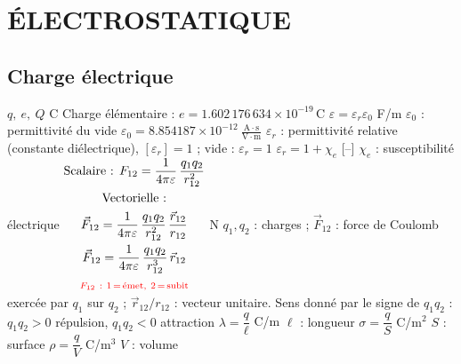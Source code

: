 \section{ÉLECTROSTATIQUE}

\subsection{Charge électrique}
\begin{formules}
    {$q,\ e,\ Q$}
    {C}
    {Charge élémentaire : \newline $e = 1.602\,176\,634\times10^{-19}$\,C}
    {$\varepsilon = \varepsilon_r\varepsilon_0$}
    {F/m}
    {$\varepsilon_0$ : permittivité du vide \newline
     $\varepsilon_0 = 8.854187\times10^{-12}\ \frac{\mathrm{A\cdot s}}{\mathrm{V\cdot m}}$ \newline
     $\varepsilon_r$ : permittivité relative (constante diélectrique), \newline
     $[\varepsilon_r] = 1$ ; vide : $\varepsilon_r = 1$}
    {$\varepsilon_r = 1 + \chi_e$}
    {[--]}
    {$\chi_e$ : susceptibilité électrique \newline [--]}
    {$\begin{gathered}
      \text{Scalaire : } F_{12} = \frac{1}{4\pi\varepsilon}\,\frac{q_1q_2}{r_{12}^2} \\
      \text{Vectorielle :} \\
      \vec F_{12} = \frac{1}{4\pi\varepsilon}\,\frac{q_1q_2}{r_{12}^2}\,\frac{\vec r_{12}}{r_{12}} \\
      \vec F_{12} = \frac{1}{4\pi\varepsilon}\,\frac{q_1q_2}{r_{12}^3}\,\vec r_{12} \\
      \textcolor{red}{\scriptstyle F_{12}\ :\ 1\,=\,\text{émet},\ 2\,=\,\text{subit}}
     \end{gathered}$}
    {N}
    {
     $q_1, q_2$ : charges ; $\vec F_{12}$ : force de Coulomb exercée par $q_1$ sur $q_2$ ;
     $\vec r_{12}/r_{12}$ : vecteur unitaire. Sens donné par le signe de $q_1q_2$ :
     $q_1q_2 > 0$ répulsion, $q_1q_2 < 0$ attraction}
    {$\lambda = \dfrac{q}{\ell}$}
    {C/m}
    {$\ell$ : longueur}
    {$\sigma = \dfrac{q}{S}$}
    {C/m$^2$}
    {$S$ : surface}
    {$\rho = \dfrac{q}{V}$}
    {C/m$^3$}
    {$V$ : volume}
\end{formules}

